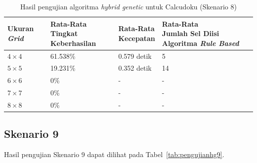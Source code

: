 \begin{table}
\centering
\captionsetup{justification=centering}
\caption[Hasil pengujian algoritma \textit{hybrid genetic} untuk Calcudoku (Skenario 8)]{Hasil pengujian algoritma \textit{hybrid genetic} untuk Calcudoku (Skenario 8)}
\begin{tabular}{| l | l | l | l |}
\hline
Ukuran \textit{Grid} & \makecell[l]{Rata-Rata \\ Tingkat Keberhasilan} & \makecell[l]{Rata-Rata \\ Kecepatan} & \makecell[l]{Rata-Rata \\ Jumlah Sel Diisi Algoritma \textit{Rule Based}} \\
\hline \hline
\begin{math}4 \times 4\end{math} & 61.538\% & 0.579 detik & 5 \\
\hline
\begin{math}5 \times 5\end{math} & 19.231\% & 0.352 detik & 14 \\
\hline
\begin{math}6 \times 6\end{math} & 0\% & - & - \\
\hline
\begin{math}7 \times 7\end{math} & 0\% & - & - \\
\hline
\begin{math}8 \times 8\end{math} & 0\% & - & - \\
\hline
\end{tabular}
\label{tab:pengujianhg8}
\end{table}

\subsection{Skenario 9}
\label{sec:skenario9}

Hasil pengujian Skenario 9 dapat dilihat pada Tabel~\ref{tab:pengujianhg9}.

